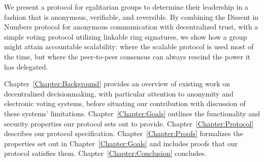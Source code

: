 We present a protocol for egalitarian groups to determine their leadership in a
fashion that is anonymous, verifiable, and reversible.  By combining the Dissent
in Numbers protocol for anonymous communication with decentralized trust, with a
simple voting protocol utilizing linkable ring signatures, we show how a group
might attain accountable scalability: where the scalable protocol is used most
of the time, but where the peer-to-peer consensus can always rescind the power
it has delegated.

Chapter~\ref{Chapter:Background} provides an overview of existing work on
decentralized decisionmaking, with particular attention to anonymity and
electronic voting systems, before situating our contribution with discussion of
these systems' limitations. Chapter~\ref{Chapter:Goals} outlines the
functionality and security properties our protocol sets out to provide.
Chapter~\ref{Chapter:Protocol} describes our protocol specification.
Chapter~\ref{Chapter:Proofs} formalizes the properties set out in
Chapter~\ref{Chapter:Goals} and includes proofs that our protocol
satisfies them. Chapter~\ref{Chapter:Conclusion} concludes.

